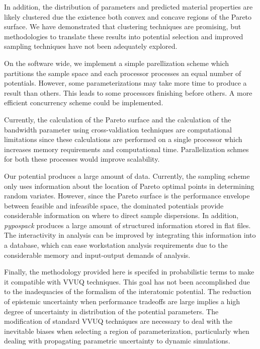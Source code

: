In addition, the distribution of parameters and predicted material properties are likely clustered due the existence both convex and concave regions of the Pareto surface.  We have demonstrated that clustering techniques are promising, but methodologies to translate these results into potential selection and improved sampling techniques have not been adequately explored.

On the software wide, we implement a simple parellization scheme which partitions the sample space and each processor processes an equal number of potentials.  However, some parameterizations may take more time to produce a result than others.  This leads to some processors finishing before others.  A more efficient concurrency scheme could be implemented.

Currently, the calculation of the Pareto surface and the calculation of the bandwidth parameter using cross-valdiation techniques are computational limitations since these calculations are performed on a single processor which increases memory requirements and computational time.   Parallelization schmes for both these processes would improve scalability.

Our potential produces a large amount of data.  Currently, the sampling scheme only uses information about the location of Pareto optimal points in determining random variates.  However, since the Pareto surface is the performance envelope between feasible and infeasible space, the dominated potentials provide considerable information on where to direct sample dispersions.  In addition, \emph{pypospack} produces a large amount of structured information stored in flat files.  The interactivity in analysis can be improved by integrating this information into a database, which can ease workstation analysis requirements due to the considerable memory and input-output demands of analysis.

Finally, the methodology provided here is specifed in probabilistic terms to make it compatible with VVUQ techniques.  This goal has not been accomplished due to the inadequacies of the formalism of the interatomic potential.  The reduction of epistemic uncertainty when performance tradeoffs are large implies a high degree of uncertainty in distribution of the potential parameters.  The modification of standard VVUQ techniques are necessary to deal with the inevitable biases when selecting a region of parameterization, particularly when dealing with propagating parametric uncertainty to dynamic simulations.
